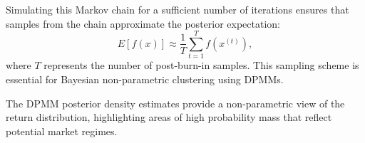 Simulating this Markov chain for a sufficient number of iterations ensures that samples from the chain approximate the posterior expectation:
\[
E[f(x)] \approx \frac{1}{T} \sum_{t=1}^{T} f(x^{(t)}),
\]
where \( T \) represents the number of post-burn-in samples.\cite{neal2000markov} 
\newline This sampling scheme is essential for Bayesian non-parametric clustering using DPMMs.

 The DPMM posterior density estimates provide a non-parametric view of the return distribution, highlighting areas of high probability mass that reflect potential market regimes.\cite{perrakis2024nonparametric}